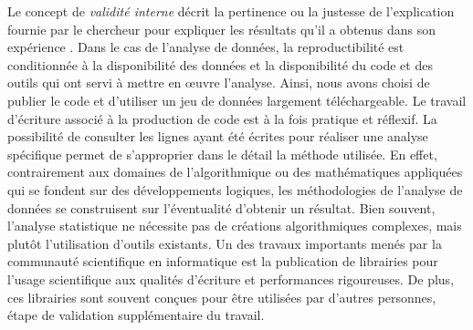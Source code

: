 Le concept de \textit{validité interne} décrit la pertinence ou la justesse de l'explication fournie par le chercheur pour expliquer les résultats qu'il a obtenus dans son expérience \citep{Yin2009a}. Dans le cas de l'analyse de données, la reproductibilité est conditionnée à la disponibilité des données et la disponibilité du code et des outils qui ont servi à mettre en œuvre l'analyse. Ainsi, nous avons choisi de publier le code et d'utiliser un jeu de données largement téléchargeable. Le travail d'écriture associé à la production de code est à la fois pratique et réflexif. La possibilité de consulter les lignes ayant été écrites pour réaliser une analyse spécifique permet de s'approprier dans le détail la méthode utilisée. En effet, contrairement aux domaines de l'algorithmique ou des mathématiques appliquées qui se fondent sur des développements logiques, les méthodologies de l'analyse de données se construisent sur l'éventualité d'obtenir un résultat. Bien souvent, l'analyse statistique ne nécessite pas de créations algorithmiques complexes, mais plutôt l'utilisation d'outils existants. Un des travaux importants menés par la communauté scientifique en informatique est la publication de librairies pour l'usage scientifique aux qualités d'écriture et performances rigoureuses. De plus, ces librairies sont souvent conçues pour être utilisées par d'autres personnes, étape de validation supplémentaire du travail. 

